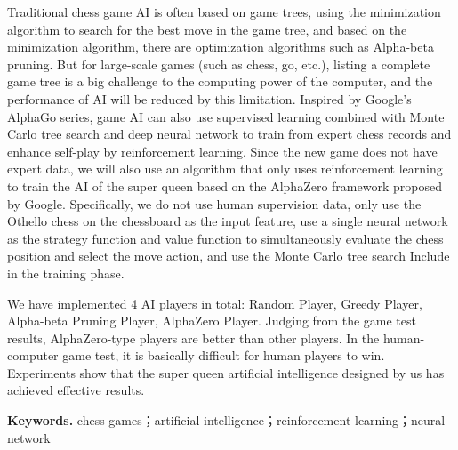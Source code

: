 Traditional chess game AI is often based on game trees, using the minimization algorithm to search for the best move in the game tree, and based on the minimization algorithm, there are optimization algorithms such as Alpha-beta pruning. But for large-scale games (such as chess, go, etc.), listing a complete game tree is a big challenge to the computing power of the computer, and the performance of AI will be reduced by this limitation. Inspired by Google's AlphaGo series, game AI can also use supervised learning combined with Monte Carlo tree search and deep neural network to train from expert chess records and enhance self-play by reinforcement learning.
Since the new game does not have expert data, we will also use an algorithm that only uses reinforcement learning to train the AI of the super queen based on the AlphaZero framework proposed by Google. Specifically, we do not use human supervision data, only use the Othello chess on the chessboard as the input feature, use a single neural network as the strategy function and value function to simultaneously evaluate the chess position and select the move action, and use the Monte Carlo tree search Include in the training phase.


We have implemented 4 AI players in total: Random Player, Greedy Player, Alpha-beta Pruning Player, AlphaZero Player. Judging from the game test results, AlphaZero-type players are better than other players. In the human-computer game test, it is basically difficult for human players to win. Experiments show that the super queen artificial intelligence designed by us has achieved effective results.

\noindent\textbf{Keywords.} chess games；artificial intelligence；reinforcement learning；neural network